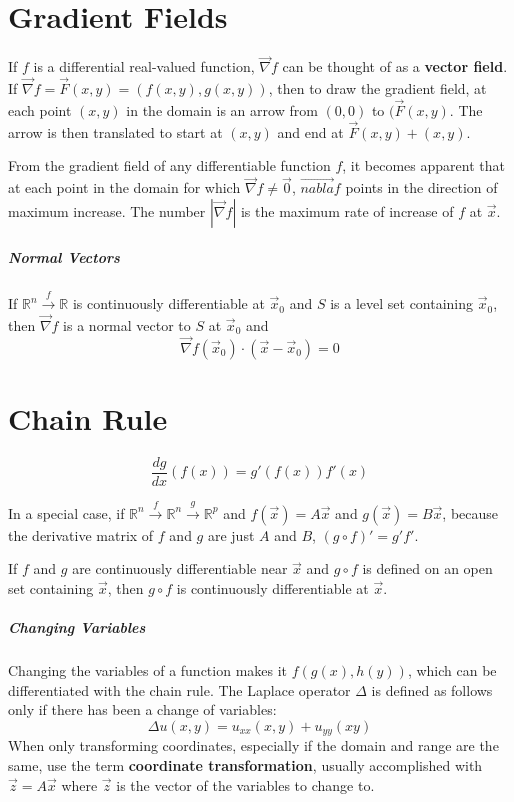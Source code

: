 \documentclass[11pt]{article}
\begin{document}
\section{Gradient Fields}
	If $f$ is a differential real-valued function, $\vec{\nabla} f$ can be thought of as a \textbf{vector field}. If $\vec{\nabla} f = \vec{F}(x, y) = (f(x, y), g(x, y))$, then to draw the gradient field, at each point $(x, y)$ in the domain is an arrow from $(0,0)$ to $(\vec{F}(x, y)$. The arrow is then translated to start at $(x, y)$ and end at $\vec{F}(x, y) + (x, y)$.
	
	From the gradient field of any differentiable function $f$, it becomes apparent that at each point in the domain for which $\vec{\nabla} f \neq \vec{0}$, $\vec{nabla} f$ points in the direction of maximum increase. The number $|\vec{\nabla} f|$ is the maximum rate of increase of $f$ at $\vec{x}$.
	
	\subparagraph{Normal Vectors} If $\mathbb{R}^n \xrightarrow{f} \mathbb{R}$ is continuously differentiable at $\vec{x}_0$ and $S$ is a level set containing $\vec{x}_0$, then $\vec{\nabla}f$ is a normal vector to $S$ at $\vec{x}_0$ and
	\begin{equation}
		\vec{\nabla}f(\vec{x}_0) \cdot (\vec{x}-\vec{x}_0) = 0
	\end{equation}
	
\section{Chain Rule}
	\begin{equation}
		\frac{dg}{dx} (f(x)) = g'(f(x))f'(x)
	\end{equation}
	
	In a special case, if $\mathbb{R}^n \xrightarrow{f} \mathbb{R}^n \xrightarrow{g} \mathbb{R}^p$ and $f(\vec{x}) = A\vec{x}$ and $g(\vec{x}) = B\vec{x}$, because the derivative matrix of $f$ and $g$ are just $A$ and $B$, $(g\circ f)'= g'f'$.
	
	If $f$ and $g$ are continuously differentiable near $\vec{x}$ and $g\circ f$ is defined on an open set containing $\vec{x}$, then $g\circ f$ is continuously differentiable at $\vec{x}$.
	
	\subparagraph{Changing Variables} Changing the variables of a function makes it $f(g(x), h(y))$, which can be differentiated with the chain rule. The Laplace operator $\Delta$ is defined as follows only if there has been a change of variables: 
	\[\Delta u(x, y) = u_{xx}(x, y) + u_{yy}(x y)\]
	When only transforming coordinates, especially if the domain and range are the same, use the term \textbf{coordinate transformation}, usually accomplished with $\vec{z} = A\vec{x}$ where $\vec{z}$ is the vector of the variables to change to.
	
\end{document}
